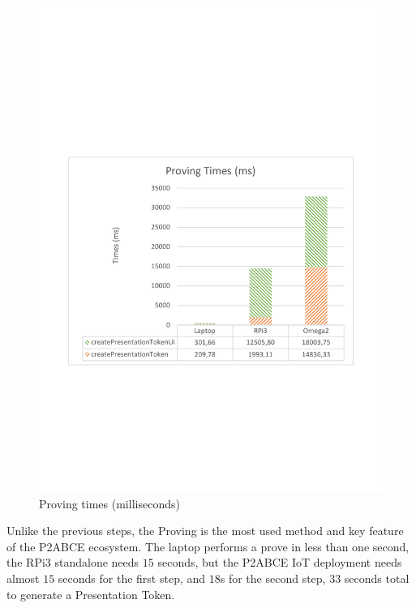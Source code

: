 \begin{figure}[bth]
	\centering
	\includegraphics[width=0.8\linewidth]{gfx/ProvingGraphTable}
	\caption{Proving times (milliseconds)}%
	\label{fig:proving:graph}
\end{figure}


Unlike the previous steps, the Proving is the most used method and key feature of the P2ABCE ecosystem. The laptop performs a prove in less than one second, the RPi3 standalone needs $15$ seconds, but the P2ABCE IoT deployment needs almost $15$ seconds for the first step, and $18$s for the second step, $33$ seconds total to generate a Presentation Token.

\hfil


